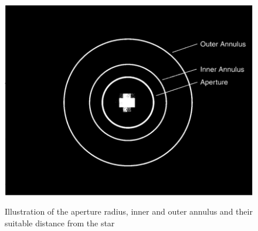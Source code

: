 \documentclass[12pt]{article}
\begin{document}
\begin{figure}[H]
\centering
\includegraphics[scale=0.5]{Images/AsImages/Photometry.png} \\ [0.3cm]
\caption{Illustration of the aperture radius, inner and outer annulus and their suitable distance from the star}
\label{SS-Annuli}
\end{figure}
\end{document}

